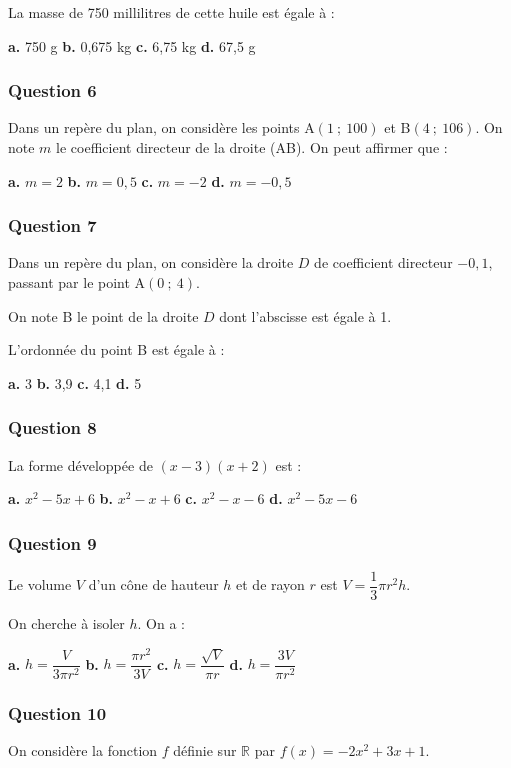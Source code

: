 La masse de 750 millilitres de cette huile est égale à :

\textbf{a.} 750 g \hfill \textbf{b.} 0,675 kg \hfill \textbf{c.} 6,75 kg \hfill \textbf{d.} 67,5 g

\subsubsection*{Question 6}
Dans un repère du plan, on considère les points A$(1~;~100)$ et B$(4~;~106)$. On note $m$ le coefficient directeur de la droite (AB). On peut affirmer que :

\textbf{a.} $m = 2$ \hfill \textbf{b.} $m = 0,5$ \hfill \textbf{c.} $m = -2$ \hfill \textbf{d.} $m = -0,5$

\subsubsection*{Question 7}
Dans un repère du plan, on considère la droite $D$ de coefficient directeur $-0,1$, passant par le point A$(0~;~4)$.

On note B le point de la droite $D$ dont l'abscisse est égale à 1.

L'ordonnée du point B est égale à :

\textbf{a.} 3 \hfill \textbf{b.} 3,9 \hfill \textbf{c.} 4,1 \hfill \textbf{d.} 5

\subsubsection*{Question 8}
La forme développée de $(x - 3)(x + 2)$ est :

\textbf{a.} $x^2 - 5x + 6$ \hfill \textbf{b.} $x^2 - x + 6$ \hfill \textbf{c.} $x^2 - x - 6$ \hfill \textbf{d.} $x^2 - 5x - 6$

\subsubsection*{Question 9}
Le volume $V$ d'un cône de hauteur $h$ et de rayon $r$ est $V = \dfrac{1}{3} \pi r^2 h$.

On cherche à isoler $h$. On a :

\textbf{a.} $h = \dfrac{V}{3 \pi r^2}$ \hfill \textbf{b.} $h = \dfrac{\pi r^2}{3V}$ \hfill \textbf{c.} $h = \dfrac{\sqrt{V}}{\pi r}$ \hfill \textbf{d.} $h = \dfrac{3V}{\pi r^2}$

\subsubsection*{Question 10}
On considère la fonction $f$ définie sur $\mathbb{R}$ par $f(x) = -2x^2 + 3x + 1$.

